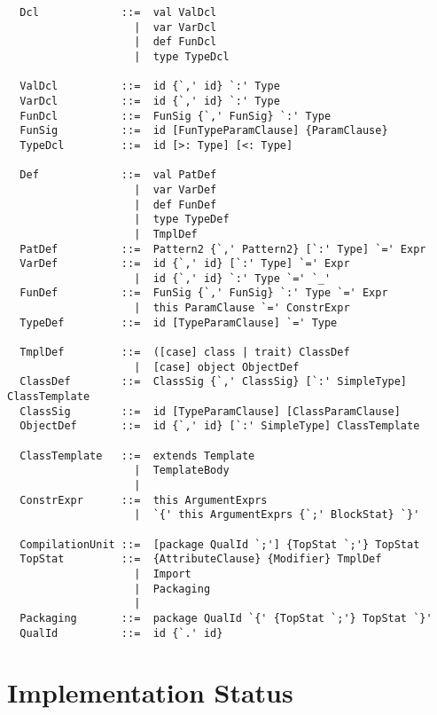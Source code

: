 \begin{lstlisting}
  Dcl             ::=  val ValDcl
                    |  var VarDcl
                    |  def FunDcl
                    |  type TypeDcl

  ValDcl          ::=  id {`,' id} `:' Type
  VarDcl          ::=  id {`,' id} `:' Type
  FunDcl          ::=  FunSig {`,' FunSig} `:' Type
  FunSig          ::=  id [FunTypeParamClause] {ParamClause}
  TypeDcl         ::=  id [>: Type] [<: Type]

  Def             ::=  val PatDef
                    |  var VarDef
                    |  def FunDef
                    |  type TypeDef
                    |  TmplDef
  PatDef          ::=  Pattern2 {`,' Pattern2} [`:' Type] `=' Expr
  VarDef          ::=  id {`,' id} [`:' Type] `=' Expr
                    |  id {`,' id} `:' Type `=' `_'
  FunDef          ::=  FunSig {`,' FunSig} `:' Type `=' Expr
                    |  this ParamClause `=' ConstrExpr
  TypeDef         ::=  id [TypeParamClause] `=' Type

  TmplDef         ::=  ([case] class | trait) ClassDef
                    |  [case] object ObjectDef
  ClassDef        ::=  ClassSig {`,' ClassSig} [`:' SimpleType] ClassTemplate
  ClassSig        ::=  id [TypeParamClause] [ClassParamClause]
  ObjectDef       ::=  id {`,' id} [`:' SimpleType] ClassTemplate

  ClassTemplate   ::=  extends Template
                    |  TemplateBody
                    |
  ConstrExpr      ::=  this ArgumentExprs
                    |  `{' this ArgumentExprs {`;' BlockStat} `}'

  CompilationUnit ::=  [package QualId `;'] {TopStat `;'} TopStat
  TopStat         ::=  {AttributeClause} {Modifier} TmplDef
                    |  Import
                    |  Packaging
                    |
  Packaging       ::=  package QualId `{' {TopStat `;'} TopStat `}'
  QualId          ::=  id {`.' id}
\end{lstlisting}

\chapter{Implementation Status}





